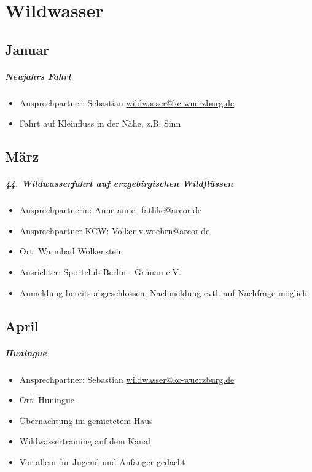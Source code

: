 \documentclass[12pt, a4paper]{report}
\begin{document}
\chapter*{Wildwasser}
\thispagestyle{Wildwasser}
\pagestyle{Wildwasser}
\section*{Januar}\paragraph{Neujahrs Fahrt}
\begin{itemize}
    \item Ansprechpartner: Sebastian \href{mailto:wildwasser@kc-wuerzburg.de}{wildwasser@kc-wuerzburg.de}
    \item Fahrt auf Kleinfluss in der Nähe, z.B. Sinn 
\end{itemize}

\section*{März}\paragraph{44. Wildwasserfahrt auf erzgebirgischen Wildflüssen}
\begin{itemize}
    \item Ansprechpartnerin: Anne \href{mailto:anne\_fathke@arcor.de}{anne\_fathke@arcor.de}
    \item Ansprechpartner KCW: Volker \href{mailto:v.woehrn@arcor.de}{v.woehrn@arcor.de}
    \item Ort:  Warmbad Wolkenstein
    \item Ausrichter: Sportclub Berlin - Grünau e.V.
    \item Anmeldung bereits abgeschlossen, Nachmeldung evtl. auf Nachfrage möglich
\end{itemize}

\section*{April}\paragraph{Huningue}
\begin{itemize}
    \item Ansprechpartner: Sebastian \href{mailto:wildwasser@kc-wuerzburg.de}{wildwasser@kc-wuerzburg.de}
    \item Ort: Huningue
    \item Übernachtung im gemietetem Haus
    \item Wildwassertraining auf dem Kanal
    \item Vor allem für Jugend und Anfänger gedacht
\end{itemize}
\end{document}
